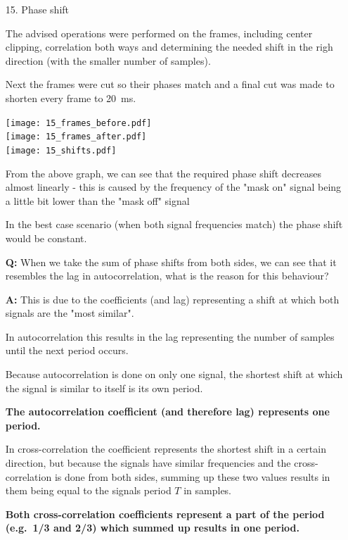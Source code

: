 \documentclass[a4paper, 11pt]{article}
\begin{document}
\begin{enumerate}
        \newpage
        \item[15.]
        Phase shift

        The advised operations were performed on the frames, including center clipping,
        correlation both ways and determining the needed shift
        in the righ direction (with the smaller number of samples).

        Next the frames were cut so their phases match and a final cut was made to shorten every frame to 20~ms.

        \texttt{[image: 15\_frames\_before.pdf]} \\
        \texttt{[image: 15\_frames\_after.pdf]} \\
        \texttt{[image: 15\_shifts.pdf]}

        From the above graph, we can see that the required phase shift decreases almost linearly -
        this is caused by the frequency of the "mask on" signal being a little bit lower than the "mask off" signal

        In the best case scenario (when both signal frequencies match) the phase shift would be constant.

        \vspace{6mm}

        \textbf{Q:} When we take the sum of phase shifts from both sides,
        we can see that it resembles the lag in autocorrelation,
        what is the reason for this behaviour?

        \textbf{A:} This is due to the coefficients (and lag) representing a shift at which both signals are the "most similar".

        In autocorrelation this results in the lag representing the number of samples until the next period occurs.

        Because autocorrelation is done on only one signal,
        the shortest shift at which the signal is similar to itself is its own period.

        \textbf{The autocorrelation coefficient (and therefore lag) represents one period.}

        In cross-correlation the coefficient represents the shortest shift in a certain direction,
        but because the signals have similar frequencies and the cross-correlation is done from both sides,
        summing up these two values results in them
        being equal to the signals period $T$ in samples.

        \textbf{Both cross-correlation coefficients represent a part of the period (e.g.\ 1/3 and 2/3)
        which summed up results in one period.}
    \end{enumerate}
\end{document}
